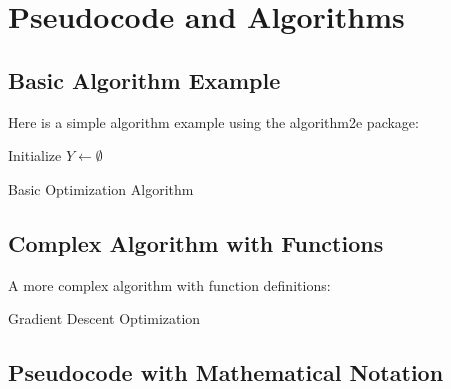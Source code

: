 \documentclass[a4paper,11pt]{article}
\begin{document}
\section{Pseudocode and Algorithms}
\label{sec:algorithms}

\subsection{Basic Algorithm Example}

Here is a simple algorithm example using the algorithm2e package:

\begin{algorithm}[H]
	\SetAlgoLined
	Initialize $Y \gets \emptyset$\;
	\;
	\caption{Basic Optimization Algorithm}
\end{algorithm}

\subsection{Complex Algorithm with Functions}

A more complex algorithm with function definitions:

\begin{algorithm}[H]
	\SetAlgoLined
	
	\caption{Gradient Descent Optimization}
\end{algorithm}

\subsection{Pseudocode with Mathematical Notation}
\end{document}
